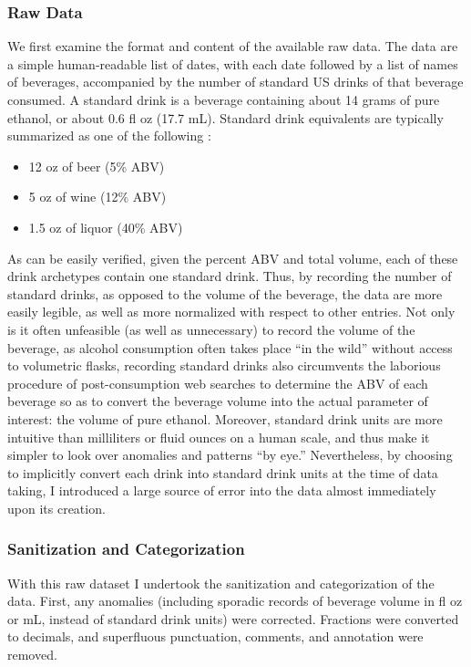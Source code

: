\documentclass{article}
\begin{document}
\begin{multicols}{2}
	\subsubsection*{Raw Data}
	We first examine the format and content of the available raw data. The data are a simple human-readable list of dates, with each date followed by a list of names of beverages, accompanied by the number of standard US drinks of that beverage consumed. A standard drink is a beverage containing about 14 grams of pure ethanol, or about 0.6 fl oz (17.7 mL). Standard drink equivalents are typically summarized as one of the following \cite{nih}:
	\begin{itemize}
		\setlength\itemsep{0.05em}
		\item 12 oz of beer (5\% ABV)
		\item 5 oz of wine (12\% ABV)
		\item 1.5 oz of liquor (40\% ABV)
	\end{itemize}
	As can be easily verified, given the percent ABV and total volume, each of these drink archetypes contain one standard drink. Thus, by recording the number of standard drinks, as opposed to the volume of the beverage, the data are more easily legible, as well as more normalized with respect to other entries. Not only is it often unfeasible (as well as unnecessary) to record the volume of the beverage, as alcohol consumption often takes place ``in the wild'' without access to volumetric flasks, recording standard drinks also circumvents the laborious procedure of post-consumption web searches to determine the ABV of each beverage so as to convert the beverage volume into the actual parameter of interest: the volume of pure ethanol. Moreover, standard drink units are more intuitive than milliliters or fluid ounces on a human scale, and thus make it simpler to look over anomalies and patterns ``by eye.'' Nevertheless, by choosing to implicitly convert each drink into standard drink units at the time of data taking, I introduced a large source of error into the data almost immediately upon its creation.
	
	\vspace*{-.5em}
	\subsubsection*{Sanitization and Categorization}
	With this raw dataset I undertook the sanitization and categorization of the data. First, any anomalies (including sporadic records of beverage volume in fl oz or mL, instead of standard drink units) were corrected. Fractions were converted to decimals, and superfluous punctuation, comments, and annotation were removed.
	

\end{multicols}
\end{document}
